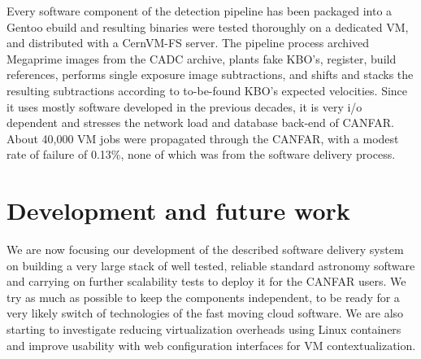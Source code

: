 Every software component of the detection pipeline has
been packaged into a Gentoo ebuild and resulting binaries were tested
thoroughly on a dedicated VM, and distributed with a CernVM-FS
server. The pipeline process archived Megaprime images from the CADC archive,
plants fake KBO's, register, build references, performs single
exposure image subtractions, and shifts and stacks the resulting
subtractions according to to-be-found KBO's expected velocities. Since
it uses mostly software developed in the previous decades, it is very
i/o dependent and stresses the network load and database back-end of
CANFAR. About 40,000 VM jobs were propagated through the CANFAR, with
a modest rate of failure of 0.13\%, none of which was from the software
delivery process.

\section{Development and future work}
We are now focusing our development of the described software
delivery system on building a very large stack of well tested,
reliable standard astronomy software and carrying on further scalability
tests to deploy it for the CANFAR users. We try as much as possible to keep the components
independent, to be ready for a very likely switch of technologies of
the fast moving cloud software. We are also starting to investigate
reducing virtualization overheads using Linux containers and improve
usability with web configuration interfaces for VM contextualization.


